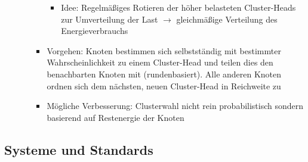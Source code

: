 \begin{itemize}
\begin{itemize}
\begin{itemize}
\begin{itemize}
				\item Idee: Regelmäßiges Rotieren der höher belasteten Cluster-Heads zur Umverteilung der Last \(\rightarrow\) gleichmäßige Verteilung des Energieverbrauchs
			\end{itemize}
			\item Vorgehen: Knoten bestimmen sich selbstständig mit bestimmter Wahrscheinlichkeit zu einem Cluster-Head und teilen dies den benachbarten Knoten mit (rundenbasiert). Alle anderen Knoten ordnen sich dem nächsten, neuen Cluster-Head in Reichweite zu
			\item Mögliche Verbesserung: Clusterwahl nicht rein probabilistisch sondern basierend auf Restenergie der Knoten
		\end{itemize}
	\end{itemize}
\end{itemize}


\subsection{Systeme und Standards}

